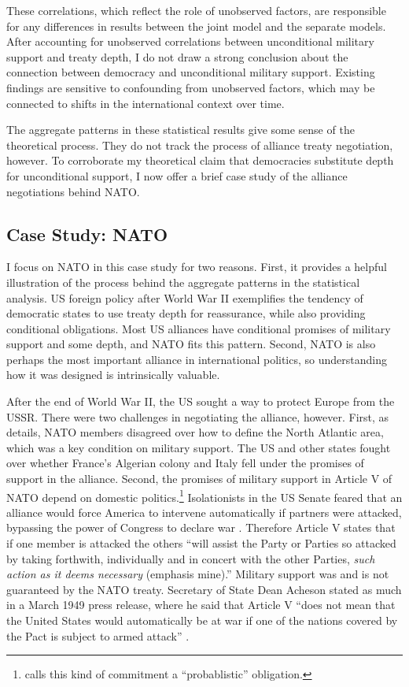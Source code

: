 \documentclass[12pt]{article}
\begin{document}
These correlations, which reflect the role of unobserved factors, are responsible for any differences in results between the joint model and the separate models. 
After accounting for unobserved correlations between unconditional military support and treaty depth, I do not draw a strong conclusion about the connection between democracy and unconditional military support. 
Existing findings are sensitive to confounding from unobserved factors, which may be connected to shifts in the international context over time. 
 

The aggregate patterns in these statistical results give some sense of the theoretical process. 
They do not track the process of alliance treaty negotiation, however. 
To corroborate my theoretical claim that democracies substitute depth for unconditional support, I now offer a brief case study of the alliance negotiations behind NATO. 


\subsection{Case Study: NATO}


I focus on NATO in this case study for two reasons. 
First, it provides a helpful illustration of the process behind the aggregate patterns in the statistical analysis. 
US foreign policy after World War II exemplifies the tendency of democratic states to use treaty depth for reassurance, while also providing conditional obligations.  
Most US alliances have conditional promises of military support and some depth, and NATO fits this pattern.
Second, NATO is also perhaps the most important alliance in international politics, so understanding how it was designed is intrinsically valuable. 


After the end of World War II, the US sought a way to protect Europe from the USSR. 
There were two challenges in negotiating the alliance, however.
First, as \citet{Poast2019a} details, NATO members disagreed over how to define the North Atlantic area, which was a key condition on military support. 
The US and other states fought over whether France's Algerian colony and Italy fell under the promises of support in the alliance. 
Second, the promises of military support in Article V of NATO depend on domestic politics.\footnote{\citet{Benson2012} calls this kind of commitment a ``probablistic'' obligation.} 
Isolationists in the US Senate feared that an alliance would force America to intervene automatically if partners were attacked, bypassing the power of Congress to declare war \citep[pg. 280-1]{Acheson1969}.
Therefore Article V states that if one member is attacked the others ``will assist the Party or Parties so attacked by taking forthwith, individually and in concert with the other Parties, \emph{such action as it deems necessary} (emphasis mine).'' 
Military support was and is not guaranteed by the NATO treaty. 
Secretary of State Dean Acheson stated as much in a March 1949 press release, where he said that Article V ``does not mean that the United States would automatically be at war if one of the nations covered by the Pact is subject to armed attack'' \citep{Acheson1949}. 
\end{document}
